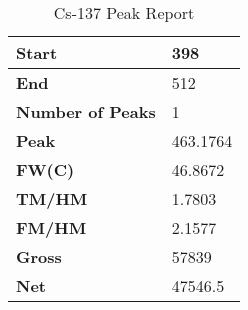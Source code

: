 \begin{table}[H]
    \centering
    \begin{tabular}{|l|l|}
        \hline
        \textbf{Start}           & 398      \\ \hline
        \textbf{End}             & 512      \\ \hline
        \textbf{Number of Peaks} & 1        \\ \hline
        \textbf{Peak}            & 463.1764 \\ \hline
        \textbf{FW(C)}           & 46.8672  \\ \hline
        \textbf{TM/HM}           & 1.7803   \\ \hline
        \textbf{FM/HM}           & 2.1577   \\ \hline
        \textbf{Gross}           & 57839    \\ \hline
        \textbf{Net}             & 47546.5  \\ \hline
    \end{tabular}
    \caption{Cs-137 Peak Report}
    \label{tab:cs}
\end{table}